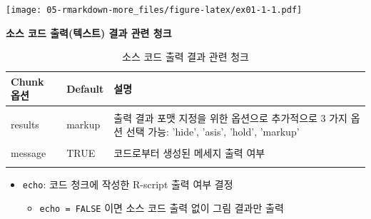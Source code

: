\documentclass[
  11pt,
]{krantz}
\newenvironment{Shaded}{\begin{snugshade}}{\end{snugshade}}
\newcommand{\CommentTok}[1]{\textcolor[rgb]{0.37,0.37,0.37}{\textit{#1}}}
\newcommand{\FunctionTok}[1]{\textcolor[rgb]{0,0,0}{#1}}
\newcommand{\NormalTok}[1]{#1}
\newcommand{\SpecialCharTok}[1]{\textcolor[rgb]{0,0,0}{#1}}
\providecommand{\tightlist}{%
  \setlength{\itemsep}{0pt}\setlength{\parskip}{0pt}}
\begin{document}
\begin{Shaded}
\end{Shaded}

\texttt{[image: 05-rmarkdown-more\_files/figure-latex/ex01-1-1.pdf]}

\normalsize

\footnotesize

\begin{Shaded}
\end{Shaded}

\normalsize

\textbf{소스 코드 출력(텍스트) 결과 관련 청크}

\footnotesize

\begin{table}[H]

\caption{\label{tab:chunk-tab-02}소스 코드 출력 결과 관련 청크}
\centering
\fontsize{14}{16}\selectfont
\begin{tabular}[t]{>{\raggedright\arraybackslash}p{3cm}>{\raggedright\arraybackslash}p{3cm}>{\raggedright\arraybackslash}p{8cm}}
\toprule
Chunk 옵션 & Default & 설명\\
\midrule
\cellcolor{gray!6}{echo} & \cellcolor{gray!6}{TRUE} & \cellcolor{gray!6}{R 실행 결과에 대응하는 코드 출력 여부}\\
results & markup & 출력 결과 포맷 지정을 위한 옵션으로 추가적으로 3 가지 옵션 선택 가능: 'hide', 'asis', 'hold', 'markup'\\
\cellcolor{gray!6}{error} & \cellcolor{gray!6}{TRUE} & \cellcolor{gray!6}{코드 또는 스크립트에 구문오류 메세지 출력 여부}\\
message & TRUE & 코드로부터 생성된 메세지 출력 여부\\
\cellcolor{gray!6}{warning} & \cellcolor{gray!6}{TRUE} & \cellcolor{gray!6}{경고 메세지 출력 여부}\\
\bottomrule
\end{tabular}
\end{table}

\normalsize

\begin{itemize}
\tightlist
\item
  \texttt{echo}: 코드 청크에 작성한 R-script 출력 여부 결정

  \begin{itemize}
  \tightlist
  \item
    \texttt{echo\ =\ FALSE} 이면 소스 코드 출력 없이 그림 결과만 출력
  \end{itemize}
\end{itemize}
\end{document}
